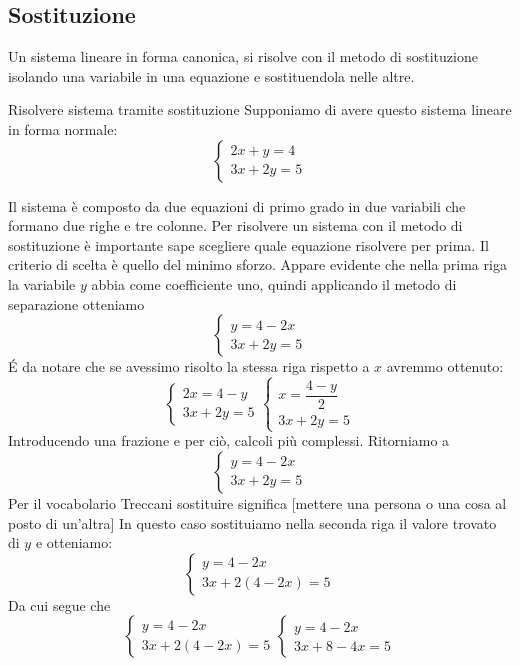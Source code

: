 \subsection{Sostituzione}
\label{sec:Sostituzione}
Un sistema lineare in forma canonica, si risolve con il metodo di sostituzione isolando una variabile in una equazione e sostituendola nelle altre. 
\begin{esempiot}{Risolvere sistema tramite sostituzione}{}
	Supponiamo di avere questo sistema lineare in forma normale:
	\[
	\begin{cases}
	2x+y=4\\
	3x+2y=5
	\end{cases}
	\]
\end{esempiot}
Il sistema è composto da due equazioni di primo grado in due variabili che formano due righe e tre colonne. Per risolvere un sistema con il metodo di sostituzione è importante sape scegliere quale equazione risolvere per prima. Il criterio di scelta è quello del minimo sforzo. Appare evidente che nella prima riga la variabile $y$ abbia come coefficiente  uno, quindi applicando il metodo di separazione otteniamo \[
\begin{cases}
y=4-2x\\
3x+2y=5
\end{cases}
\]
\'E da notare che se avessimo risolto la stessa riga rispetto a $x$ avremmo ottenuto:
\[
\begin{cases}
	2x=4-y\\
	3x+2y=5
\end{cases}
\begin{cases}
	x=\dfrac{4-y}{2}\\
	3x+2y=5
\end{cases}
\]
Introducendo una frazione e per ciò, calcoli più complessi.
Ritorniamo a \[
\begin{cases}
y=4-2x\\
3x+2y=5
\end{cases}
\] Per il vocabolario Treccani sostituire significa [mettere una persona o una cosa al posto di un'altra] In questo caso sostituiamo nella seconda riga il valore trovato di $y$ e otteniamo:
\[
\begin{cases}
y=4-2x\\
3x+2(4-2x)=5
\end{cases}
\]
Da cui segue che 
\[
\begin{cases}
y=4-2x\\
3x+2(4-2x)=5
\end{cases}
\begin{cases}
y=4-2x\\
3x+8-4x=5
\end{cases}
\]
